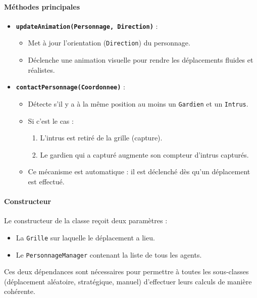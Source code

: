 \paragraph{Méthodes principales}
\begin{itemize}
    \item \textbf{\texttt{updateAnimation(Personnage, Direction)}} : 
    \begin{itemize}
        \item Met à jour l'orientation (\texttt{Direction}) du personnage.
        \item Déclenche une animation visuelle pour rendre les déplacements fluides et réalistes.
    \end{itemize}
    \item \textbf{\texttt{contactPersonnage(Coordonnee)}} :
    \begin{itemize}
        \item Détecte s’il y a à la même position au moins un \texttt{Gardien} et un \texttt{Intrus}.
        \item Si c'est le cas :
        \begin{enumerate}
            \item L'intrus est retiré de la grille (capture).
            \item Le gardien qui a capturé augmente son compteur d’intrus capturés.
        \end{enumerate}
        \item Ce mécanisme est automatique : il est déclenché dès qu'un déplacement est effectué.
    \end{itemize}
\end{itemize}

\vspace{1em}
\paragraph{Constructeur}

Le constructeur de la classe reçoit deux paramètres :
\begin{itemize}
    \item La \texttt{Grille} sur laquelle le déplacement a lieu.
    \item Le \texttt{PersonnageManager} contenant la liste de tous les agents.
\end{itemize}
Ces deux dépendances sont nécessaires pour permettre à toutes les sous-classes (déplacement aléatoire, stratégique, manuel) d’effectuer leurs calculs de manière cohérente.

